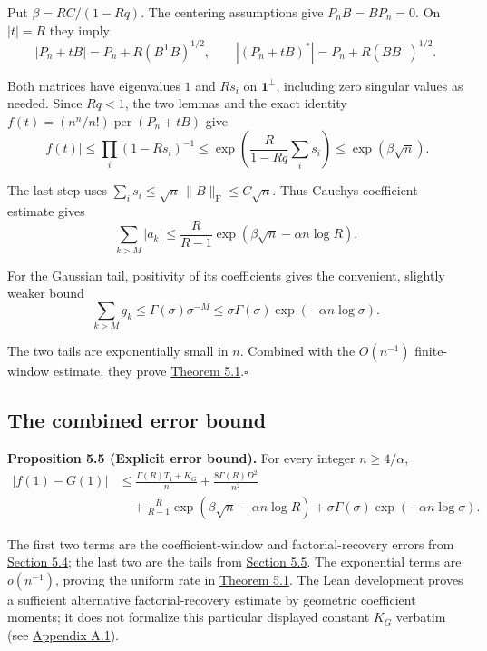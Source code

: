 \documentclass[11pt,a4paper]{article}
\makeatletter
\newcommand{\paperstatement}[3]{\par\addvspace{6pt}\Needspace{4\baselineskip}\phantomsection\def\@currentlabel{#2}\label{#3}\noindent\textbf{#1}\enspace}
\newcommand{\paperref}[2]{\hyperref[#1]{#2}}
\makeatother
\begin{document}
Put \(\beta=RC/(1-Rq)\). The centering assumptions give \(P_nB=BP_n=0\). On \(|t|=R\) they imply
\[|P_n+tB|=P_n+R(B^{\mathsf T}B)^{1/2},
\qquad
|(P_n+tB)^*|=P_n+R(BB^{\mathsf T})^{1/2}.\]

Both matrices have eigenvalues \(1\) and \(Rs_i\) on \(\mathbf1^\perp\), including zero singular values as needed. Since \(Rq<1\), the two lemmas and the exact identity \(f(t)=(n^n/n!)\operatorname{per}(P_n+tB)\) give
\[|f(t)|\le\prod_i(1-Rs_i)^{-1}
\le\exp\!\left(\frac{R}{1-Rq}\sum_i s_i\right)
\le\exp(\beta\sqrt n).\]

The last step uses \(\sum_i s_i\le\sqrt n\,\|B\|_{\mathrm F}\le C\sqrt n\). Thus Cauchy\textquotesingle s coefficient estimate gives
\[\sum_{k>M}|a_k|
\le\frac{R}{R-1}
\exp\!\left(\beta\sqrt n-\alpha n\log R\right).\]

For the Gaussian tail, positivity of its coefficients gives the convenient, slightly weaker bound
\[\sum_{k>M}g_k
\le \Gamma(\sigma)\sigma^{-M}
\le\sigma\Gamma(\sigma)\exp\!\left(-\alpha n\log\sigma\right).\]

The two tails are exponentially small in \(n\). Combined with the \(O(n^{-1})\) finite-window estimate, they prove \paperref{thm-5.1}{Theorem 5.1}.\nobreak\hspace{.5em}\mbox{$\square$}

\subsection{The combined error bound}\label{sec-5.6}

\paperstatement{Proposition 5.5 (Explicit error bound).}{5.5}{thm-5.5} For every integer \(n\ge4/\alpha\),
\[\begin{aligned}
|f(1)-G(1)|
&\le \frac{\Gamma(R)T_1+K_G}{n}
+\frac{8\Gamma(R)D^2}{n^2}
\\&\quad+\frac{R}{R-1}\exp\!\left(\beta\sqrt n-\alpha n\log R\right)
+\sigma\Gamma(\sigma)\exp\!\left(-\alpha n\log\sigma\right).
\end{aligned}\]

The first two terms are the coefficient-window and factorial-recovery errors from \paperref{sec-5.4}{Section 5.4}; the last two are the tails from \paperref{sec-5.5}{Section 5.5}. The exponential terms are \(o(n^{-1})\), proving the uniform rate in \paperref{thm-5.1}{Theorem 5.1}. The Lean development proves a sufficient alternative factorial-recovery estimate by geometric coefficient moments; it does not formalize this particular displayed constant \(K_G\) verbatim (see \paperref{sec-A.1}{Appendix A.1}).
\end{document}
